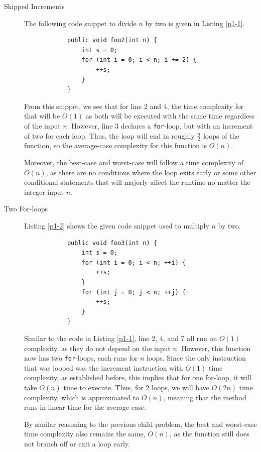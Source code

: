 \documentclass{report}
\begin{document}
\begin{description}
	\item[Skipped Increments] The following code snippet to divide $n$ by two is given in Listing \ref{p1-1}.
	\begin{listing}[h]
		\begin{verbatim}
			public void foo2(int n) {
				int s = 0;
				for (int i = 0; i < n; i += 2) {
					++s;
				}
			}
		\end{verbatim}
		\caption{Code provided.}
		\label{p1-1}
	\end{listing}
	
	From this snippet, we see that for line 2 and 4, the time complexity for that will be $O(1)$ as both will be executed with the same time regardless of the input $n$. However, line 3 declares a \lstinline|for|-loop, but with an increment of two for each loop. Thus, the loop will end in roughly $\frac{n}{2}$ loops of the function, so the average-case complexity for this function is $O(n)$.
	
	Moreover, the best-case and worst-case will follow a time complexity of $O(n)$, as there are no conditions where the loop exits early or some other conditional statements that will majorly affect the runtime no matter the integer input $n$.
	
	\item[Two For-loops] Listing \ref{p1-2} shows the given code snippet used to multiply $n$ by two.
	\begin{listing}[H]
		\begin{verbatim}
			public void foo3(int n) {
				int s = 0;
				for (int i = 0; i < n; ++i) {
					++s;
				}
				for (int j = 0; j < n; ++j) {
					++s;
				}
			}
		\end{verbatim}
		\caption{Code provided.}
		\label{p1-2}
	\end{listing}
	
	Similar to the code in Listing \ref{p1-1}, line 2, 4, and 7 all run on $O(1)$ complexity, as they do not depend on the input $n$. However, this function now has two \lstinline|for|-loops, each runs for $n$ loops. Since the only instruction that was looped was the increment instruction with $O(1)$ time complexity, as established before, this implies that for one for-loop, it will take $O(n)$ time to execute. Thus, for 2 loops, we will have $O(2n)$ time complexity, which is approximated to $O(n)$, meaning that the method runs in linear time for the average case.
	
	By similar reasoning to the previous child problem, the best and worst-case time complexity also remains the same, $O(n)$, as the function still does not branch off or exit a loop early.
	

\end{description}
\end{document}
